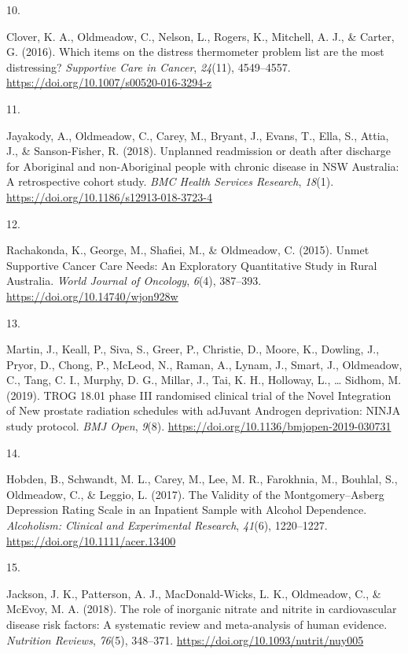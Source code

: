 \documentclass[11pt, a4paper]{awesome-cv}
\newlength{\csllabelwidth}
\newcommand{\CSLLeftMargin}[1]{\parbox[t]{\csllabelwidth}{#1}}
\newcommand{\CSLRightInline}[1]{\parbox[t]{\linewidth - \csllabelwidth}{#1}}
\begin{document}
\leavevmode\hypertarget{ref-clover_which_2016}{}%
\CSLLeftMargin{10. }
\CSLRightInline{Clover, K. A., Oldmeadow, C., Nelson, L., Rogers, K.,
Mitchell, A. J., \& Carter, G. (2016). Which items on the distress
thermometer problem list are the most distressing? \emph{Supportive Care
in Cancer}, \emph{24}(11), 4549--4557.
\url{https://doi.org/10.1007/s00520-016-3294-z}}

\leavevmode\hypertarget{ref-jayakody_unplanned_2018}{}%
\CSLLeftMargin{11. }
\CSLRightInline{Jayakody, A., Oldmeadow, C., Carey, M., Bryant, J.,
Evans, T., Ella, S., Attia, J., \& Sanson-Fisher, R. (2018). Unplanned
readmission or death after discharge for Aboriginal and non-Aboriginal
people with chronic disease in NSW Australia: A retrospective cohort
study. \emph{BMC Health Services Research}, \emph{18}(1).
\url{https://doi.org/10.1186/s12913-018-3723-4}}

\leavevmode\hypertarget{ref-rachakonda_unmet_2015}{}%
\CSLLeftMargin{12. }
\CSLRightInline{Rachakonda, K., George, M., Shafiei, M., \& Oldmeadow,
C. (2015). Unmet Supportive Cancer Care Needs: An Exploratory
Quantitative Study in Rural Australia. \emph{World Journal of Oncology},
\emph{6}(4), 387--393. \url{https://doi.org/10.14740/wjon928w}}

\leavevmode\hypertarget{ref-martin_trog_2019}{}%
\CSLLeftMargin{13. }
\CSLRightInline{Martin, J., Keall, P., Siva, S., Greer, P., Christie,
D., Moore, K., Dowling, J., Pryor, D., Chong, P., McLeod, N., Raman, A.,
Lynam, J., Smart, J., Oldmeadow, C., Tang, C. I., Murphy, D. G., Millar,
J., Tai, K. H., Holloway, L., \ldots{} Sidhom, M. (2019). TROG 18.01
phase III randomised clinical trial of the Novel Integration of New
prostate radiation schedules with adJuvant Androgen deprivation: NINJA
study protocol. \emph{BMJ Open}, \emph{9}(8).
\url{https://doi.org/10.1136/bmjopen-2019-030731}}

\leavevmode\hypertarget{ref-hobden_validity_2017}{}%
\CSLLeftMargin{14. }
\CSLRightInline{Hobden, B., Schwandt, M. L., Carey, M., Lee, M. R.,
Farokhnia, M., Bouhlal, S., Oldmeadow, C., \& Leggio, L. (2017). The
Validity of the Montgomery--Asberg Depression Rating Scale in an
Inpatient Sample with Alcohol Dependence. \emph{Alcoholism: Clinical and
Experimental Research}, \emph{41}(6), 1220--1227.
\url{https://doi.org/10.1111/acer.13400}}

\leavevmode\hypertarget{ref-jackson_role_2018}{}%
\CSLLeftMargin{15. }
\CSLRightInline{Jackson, J. K., Patterson, A. J., MacDonald-Wicks, L.
K., Oldmeadow, C., \& McEvoy, M. A. (2018). The role of inorganic
nitrate and nitrite in cardiovascular disease risk factors: A systematic
review and meta-analysis of human evidence. \emph{Nutrition Reviews},
\emph{76}(5), 348--371. \url{https://doi.org/10.1093/nutrit/nuy005}}
\end{document}
